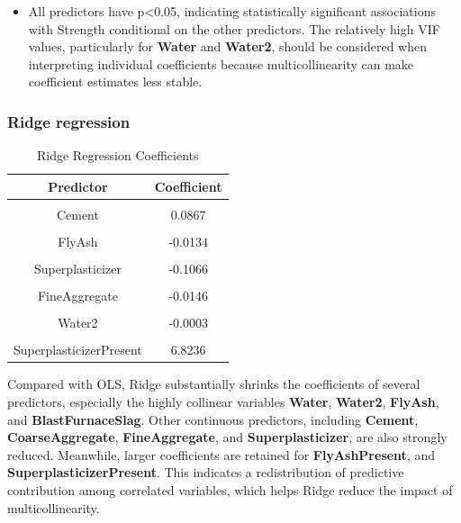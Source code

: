 \documentclass[
  11pt,
]{article}
\providecommand{\tightlist}{%
  \setlength{\itemsep}{0pt}\setlength{\parskip}{0pt}}
\begin{document}
\begin{itemize}
\tightlist
\item
  All predictors have p\textless0.05, indicating statistically
  significant associations with Strength conditional on the other
  predictors. The relatively high VIF values, particularly for
  \textbf{Water} and \textbf{Water2}, should be considered when
  interpreting individual coefficients because multicollinearity can
  make coefficient estimates less stable.
\end{itemize}

\subsubsection{Ridge regression}\label{ridge-regression}

\begin{table}[!h]
\centering
\caption{\label{tab:ridge}Ridge Regression Coefficients}
\centering
\fontsize{10}{12}\selectfont
\begin{tabular}[t]{cc}
\toprule
\textbf{Predictor} & \textbf{Coefficient}\\
\midrule
\cellcolor{gray!10}{(Intercept)} & \cellcolor{gray!10}{33.5491}\\
Cement & 0.0867\\
\cellcolor{gray!10}{BlastFurnaceSlag} & \cellcolor{gray!10}{0.0592}\\
FlyAsh & -0.0134\\
\cellcolor{gray!10}{Water} & \cellcolor{gray!10}{-0.1475}\\
\addlinespace
Superplasticizer & -0.1066\\
\cellcolor{gray!10}{CoarseAggregate} & \cellcolor{gray!10}{-0.0087}\\
FineAggregate & -0.0146\\
\cellcolor{gray!10}{LogAge} & \cellcolor{gray!10}{8.0877}\\
Water2 & -0.0003\\
\addlinespace
\cellcolor{gray!10}{FlyAshPresent} & \cellcolor{gray!10}{2.5448}\\
SuperplasticizerPresent & 6.8236\\
\bottomrule
\end{tabular}
\end{table}

Compared with OLS, Ridge substantially shrinks the coefficients of
several predictors, especially the highly collinear variables
\textbf{Water}, \textbf{Water2}, \textbf{FlyAsh}, and
\textbf{BlastFurnaceSlag}. Other continuous predictors, including
\textbf{Cement}, \textbf{CoarseAggregate}, \textbf{FineAggregate}, and
\textbf{Superplasticizer}, are also strongly reduced. Meanwhile, larger
coefficients are retained for \textbf{FlyAshPresent}, and
\textbf{SuperplasticizerPresent}. This indicates a redistribution of
predictive contribution among correlated variables, which helps Ridge
reduce the impact of multicollinearity.
\end{document}
